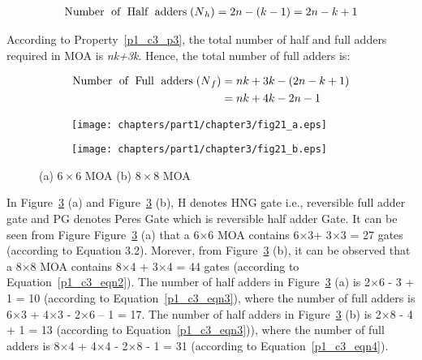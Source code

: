 \begin{align}\label{p1_c3_eqn3}
\textnormal{Number \;of\; Half\; adders}\; (N{}_{h}) = 2n-(k-1) = 2n - k + 1
\end{align}

\noindent According to Property~\ref{p1_c3_p3}, the total number of half and full adders required in MOA is \textit{nk+3k}. Hence, the total number of full adders is:

\begin{align}\label{p1_c3_eqn4}
\textnormal{Number\; of\; Full\; adders\;} (N{}_{f}) &= nk + 3k - (2n - k + 1)\\\nonumber
&=nk + 4k - 2n - 1
\end{align}
	
\begin{figure}[h]
	\centering
	\begin{subfigure}[b]{0.30\textwidth}
		\centering
		\texttt{[image: chapters/part1/chapter3/fig21\_a.eps]}
		\caption{ }
		\label{fig:p1_c3_fig21_a}
	\end{subfigure}
	\begin{subfigure}[b]{0.30\textwidth}
		\centering
		\texttt{[image: chapters/part1/chapter3/fig21\_b.eps]}
		\caption{ }
		\label{fig:p1_c3_fig21_b}
	\end{subfigure}
	\caption{(a) $6\times6$ MOA (b) $8 \times 8 $ MOA}
	\label{fig:p1_c3_fig21}
\end{figure}

\begin{example}\textnormal{
	 In Figure~\ref{fig:p1_c3_fig21} (a) and Figure~\ref{fig:p1_c3_fig21} (b), H denotes HNG gate i.e., reversible full adder gate and PG denotes Peres Gate which is reversible half adder Gate. It can be seen from Figure Figure~\ref{fig:p1_c3_fig21} (a) that a {6$\times $6} MOA contains {6$\times $3+ 3$\times $3 = 27} gates (according to Equation 3.2). Morever, from Figure~\ref{fig:p1_c3_fig21} (b), it can be observed that a {8$\times $8} MOA contains {8$\times $4 + 3$\times $4 = 44} gates (according to Equation~\ref{p1_c3_eqn2}). The number of half adders in Figure~\ref{fig:p1_c3_fig21} (a) is {2$\times $6 - 3 + 1 = 10 }(according to Equation~\ref{p1_c3_eqn3}), where the number of full adders is {6$\times $3 + 4$\times $3 - 2$\times $6 -- 1 = 17.} The number of half adders in Figure~\ref{fig:p1_c3_fig21} (b) is {2$\times $8 - 4 + 1 = 13} (according to Equation~\ref{p1_c3_eqn3})), where the number of full adders is {8$\times $4 + 4$\times $4 - 2$\times $8 - 1 = 31} (according to Equation~\ref{p1_c3_eqn4}).}
\end{example}

